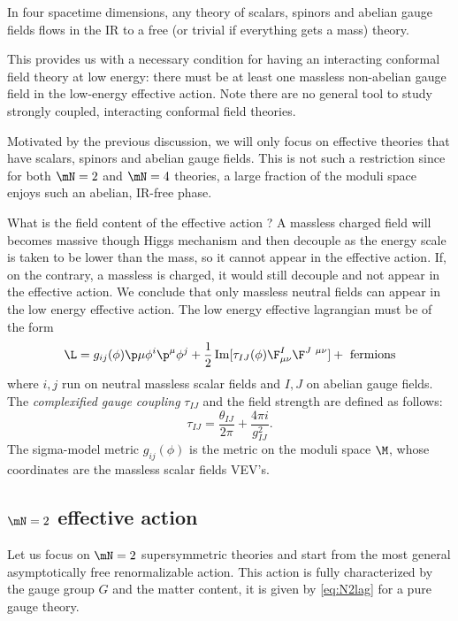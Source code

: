 \documentclass{worksheetclass}
\begin{document}
        \begin{theorem}
            In four spacetime dimensions, any theory of scalars, spinors and abelian gauge fields flows in the IR to a free (or trivial if everything gets a mass) theory.
        \end{theorem}
        This provides us with a necessary condition for having an interacting conformal field theory at low energy: there must be at least one massless non-abelian gauge field in the low-energy effective action. Note there are no general tool to study strongly coupled, interacting conformal field theories.

        Motivated by the previous discussion, we will only focus on effective theories that have scalars, spinors and abelian gauge fields. This is not such a restriction since for both $\mN=2$ and $\mN=4$ theories, a large fraction of the moduli space enjoys such an abelian, IR-free phase.
        
        What is the field content of the effective action ? A massless charged field will becomes massive though Higgs mechanism and then decouple as the energy scale is taken to be lower than the mass, so it cannot appear in the effective action. If, on the contrary, a massless is charged, it would still decouple and not appear in the effective action. We conclude that only massless neutral fields can appear in the low energy effective action. The low energy effective lagrangian must be of the form
        \begin{equation}
            \L = g_{ij}(\phi)\p\mu\phi^i\p^\mu\phi^j+\frac{1}{2}\Im[\tau_{IJ}(\phi)\F^I_{\mu\nu}\F^{J~\mu\nu}]+\text{ fermions}
        \end{equation}
        where $i,j$ run on neutral massless scalar fields and $I,J$ on abelian gauge fields. The \emph{complexified gauge coupling} $\tau_{IJ}$ and the field strength are defined as follows:
        \begin{equation}
            \tau_{IJ}=\frac{\theta_{IJ}}{2\pi}+\frac{4\pi i}{g^2_{IJ}}.
        \end{equation}
        The sigma-model metric $g_{ij}(\phi)$ is the metric on the moduli space $\M$, whose coordinates are the massless scalar fields VEV's.

    \subsection{$\mN=2$ effective action}

        Let us focus on $\mN=2$ supersymmetric theories and start from the most general asymptotically free renormalizable action. This action is fully characterized by the gauge group $G$ and the matter content, it is given by \eqref{eq:N2lag} for a pure gauge theory.
\end{document}

